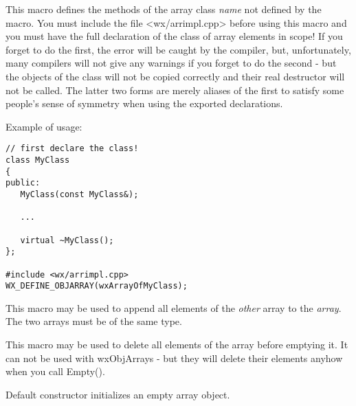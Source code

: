 
This macro defines the methods of the array class {\it name} not defined by the 
 macro. You must include the
file <wx/arrimpl.cpp> before using this macro and you must have the full
declaration of the class of array elements in scope! If you forget to do the 
first, the error will be caught by the compiler, but, unfortunately, many
compilers will not give any warnings if you forget to do the second - but the
objects of the class will not be copied correctly and their real destructor will
not be called.  The latter two forms are merely aliases of the first to satisfy
some people's sense of symmetry when using the exported declarations.

Example of usage:

\begin{verbatim}
// first declare the class!
class MyClass
{
public:
   MyClass(const MyClass&);

   ...

   virtual ~MyClass();
};

#include <wx/arrimpl.cpp>
WX_DEFINE_OBJARRAY(wxArrayOfMyClass);
\end{verbatim}

\label{wxappendarray}


This macro may be used to append all elements of the {\it other} array to the 
{\it array}. The two arrays must be of the same type.

\label{wxcleararray}


This macro may be used to delete all elements of the array before emptying it.
It can not be used with wxObjArrays - but they will delete their elements anyhow
when you call Empty().

\label{wxarrayctordef}



Default constructor initializes an empty array object.


